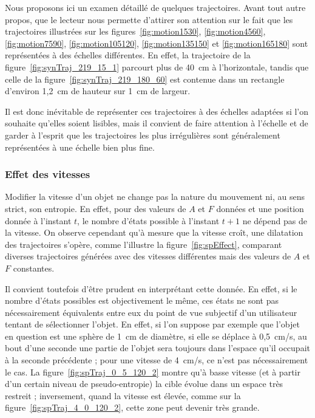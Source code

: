 	Nous proposons ici un examen détaillé de quelques trajectoires. Avant tout autre propos, que le lecteur nous permette d'attirer son attention sur le fait que les trajectoires illustrées sur les figures~\ref{fig:motion1530}, \ref{fig:motion4560}, \ref{fig:motion7590}, \ref{fig:motion105120}, \ref{fig:motion135150} et \ref{fig:motion165180} sont représentées à des échelles différentes. En effet, la trajectoire de la figure~\ref{fig:synTraj_219_15_1} parcourt plus de 40~cm à l'horizontale, tandis que celle de la figure~\ref{fig:synTraj_219_180_60} est contenue dans un rectangle d'environ 1,2~cm de hauteur sur 1~cm de largeur.
	
	Il est donc inévitable de représenter ces trajectoires à des échelles adaptées si l'on souhaite qu'elles soient lisibles, mais il convient de faire attention à l'échelle et de garder à l'esprit que les trajectoires les plus irrégulières sont généralement représentées à une échelle bien plus fine.
	
	\subsubsection{Effet des vitesses}
	Modifier la vitesse d'un objet ne change pas la \og nature \fg{} du mouvement ni, au sens strict, son entropie. En effet, pour des valeurs de $A$ et $F$ données et une position donnée à l'instant $t$, le nombre d'états possible à l'instant $t+1$ ne dépend pas de la vitesse. On observe cependant qu'à mesure que la vitesse croît, une \og dilatation \fg{} des trajectoires s'opère, comme l'illustre la figure~\ref{fig:spEffect}, comparant diverses trajectoires générées avec des vitesses différentes mais des valeurs de $A$ et $F$ constantes.
	
	Il convient toutefois d'être prudent en interprétant cette donnée. En effet, si le nombre d'états possibles est objectivement le même, ces états ne sont pas nécessairement équivalents entre eux du point de vue subjectif d'un utilisateur tentant de sélectionner l'objet. En effet, si l'on suppose par exemple que l'objet en question est une sphère de 1~cm de diamètre, si elle se déplace à 0,5~cm/s, au bout d'une seconde une partie de l'objet sera toujours dans l'espace qu'il occupait à la seconde précédente ; pour une vitesse de 4~cm/s, ce n'est pas nécessairement le cas. La figure~\ref{fig:spTraj_0_5_120_2} montre qu'à basse vitesse (et à partir d'un certain niveau de pseudo-entropie) la cible évolue dans un espace très restreit ; inversement, quand la vitesse est élevée, comme sur la figure~\ref{fig:spTraj_4_0_120_2}, cette zone peut devenir très grande.
	
